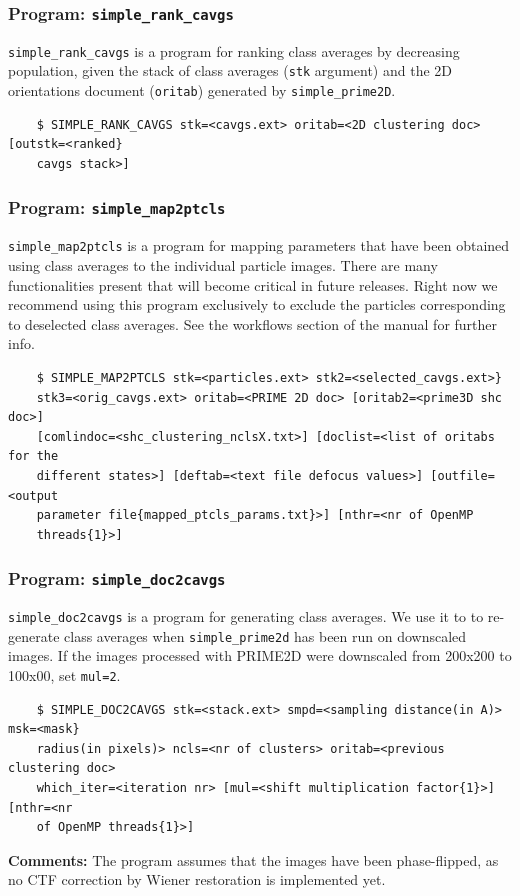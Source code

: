 \documentclass[a4paper,11pt]{article}
\newcommand{\prgname}[1]{\textcolor{NavyBlue}{\texttt{#1}}}
\begin{document}
\subsubsection{Program: \prgname{simple\_rank\_cavgs}}
\label{rank_cavgs}
\prgname{simple\_rank\_cavgs} is a program for ranking class averages by decreasing population, given the stack of class averages (\texttt{stk} argument) and the 2D orientations document (\texttt{oritab}) generated by \prgname{simple\_prime2D}.
\begin{verbatim}
    $ SIMPLE_RANK_CAVGS stk=<cavgs.ext> oritab=<2D clustering doc> [outstk=<ranked}
    cavgs stack>]
\end{verbatim}

\subsubsection{Program: \prgname{simple\_map2ptcls}}
\label{map2ptcls}
\prgname{simple\_map2ptcls} is a program for mapping parameters that have been obtained using class averages to the individual particle images. There are many functionalities present that will become critical in future releases. Right now we recommend using this program exclusively to exclude the particles corresponding to deselected class averages. See the workflows section of the manual for further info.
\begin{verbatim}
    $ SIMPLE_MAP2PTCLS stk=<particles.ext> stk2=<selected_cavgs.ext>}
    stk3=<orig_cavgs.ext> oritab=<PRIME 2D doc> [oritab2=<prime3D shc doc>]
    [comlindoc=<shc_clustering_nclsX.txt>] [doclist=<list of oritabs for the
    different states>] [deftab=<text file defocus values>] [outfile=<output
    parameter file{mapped_ptcls_params.txt}>] [nthr=<nr of OpenMP
    threads{1}>]
\end{verbatim}

\subsubsection{Program: \prgname{simple\_doc2cavgs}}
\label{doc2cavgs}
\prgname{simple\_doc2cavgs} is a program for generating class averages. We use it to to re-generate class averages when \prgname{simple\_prime2d} has been run on downscaled images. If the images processed with PRIME2D were downscaled from 200x200 to 100x00, set \texttt{mul=2}.
\begin{verbatim}
    $ SIMPLE_DOC2CAVGS stk=<stack.ext> smpd=<sampling distance(in A)> msk=<mask}
    radius(in pixels)> ncls=<nr of clusters> oritab=<previous clustering doc>
    which_iter=<iteration nr> [mul=<shift multiplication factor{1}>] [nthr=<nr
    of OpenMP threads{1}>]
\end{verbatim}
\noindent\textbf{Comments:} The program assumes that the images have been phase-flipped, as no CTF correction by Wiener restoration is implemented yet.
\end{document}
